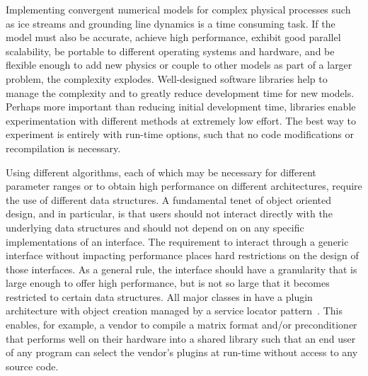 Implementing convergent numerical models for complex physical processes such as ice streams and grounding line dynamics is a time consuming task.
If the model must also be accurate, achieve high performance, exhibit good parallel scalability, be portable to different operating systems and hardware, and be flexible enough to add new physics or couple to other models as part of a larger problem, the complexity explodes.
Well-designed software libraries help to manage the complexity and to greatly reduce development time for new models.
Perhaps more important than reducing initial development time, libraries enable experimentation with different methods at extremely low effort.
The best way to experiment is entirely with run-time options, such that no code modifications or recompilation is necessary.

Using different algorithms, each of which may be necessary for different parameter ranges or to obtain high performance on different architectures, require the use of different data structures.
A fundamental tenet of object oriented design, and {\PETSc} in particular, is that users should not interact directly with the underlying data structures and should not depend on on any specific implementations of an interface.
The requirement to interact through a generic interface without impacting performance places hard restrictions on the design of those interfaces.
As a general rule, the interface should have a granularity that is large enough to offer high performance, but is not so large that it becomes restricted to certain data structures.
All major classes in {\PETSc} have a plugin architecture with object creation managed by a service locator pattern~\cite{fowler2004injection}.
This enables, for example, a vendor to compile a matrix format and/or preconditioner that performs well on their hardware into a shared library such that an end user of any {\PETSc} program can select the vendor's plugins at run-time without access to any source code.

